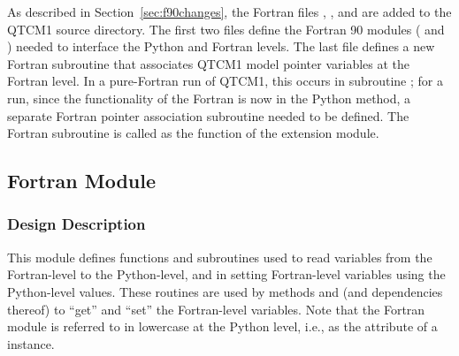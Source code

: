 As described in Section~\ref{sec:f90changes}, the Fortran files
, , and  are
added to the QTCM1 source directory.  The first two files define the Fortran
90 modules ( and ) needed to interface
the Python and Fortran levels.  The last file defines a new Fortran
subroutine  that associates QTCM1 model pointer
variables at the Fortran level.  In a pure-Fortran run of QTCM1,
this occurs in subroutine ; for a
 run, since the
functionality of the Fortran  is now in the Python
 method, a separate Fortran pointer association
subroutine needed to be defined.  The Fortran subroutine 
is called as the  function of the 
 extension module.


	\subsection{Fortran Module }   \label{sec:setbypy}

		\subsubsection{Design Description}

This module defines functions and subroutines used to read variables
from the Fortran-level to the Python-level, and in setting Fortran-level
variables using the Python-level values.  These routines are used
by  methods  and 
(and dependencies thereof) to ``get'' and ``set'' the Fortran-level
variables.  Note that the Fortran module  is referred
to in lowercase at the Python level, i.e., as the
attribute  of a  instance.

